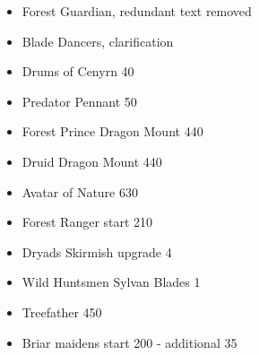 %

%
%
\subtitle{Kindreds and Aspects}

\begin{itemize}
\item Forest Guardian, redundant text removed
\end{itemize}
%
%
%
%
%
%
\subtitle{Special}

\begin{itemize}
\item Blade Dancers, clarification
\end{itemize}
%
%

\subtitle{Points}
\begin{itemize}
\item Drums of Cenyrn 40
\item Predator Pennant 50
\item Forest Prince Dragon Mount 440
\item Druid Dragon Mount 440
\item Avatar of Nature 630
\item Forest Ranger start 210
\item Dryads Skirmish upgrade 4
\item Wild Huntsmen Sylvan Blades 1
\item Treefather 450
\item Briar maidens start 200
- additional 35
\end{itemize}
